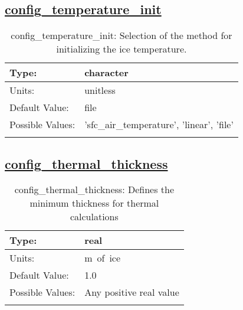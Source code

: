 \subsection[config\_temperature\_init]{\hyperref[sec:nm_tab_thermal_solver]{config\_temperature\_init}}
\label{subsec:nm_sec_config_temperature_init}
\begin{center}
\begin{longtable}{| p{2.0in} || p{4.0in} |}
    \hline
    Type: & character \\
    \hline
    Units: & \si{unitless} \\
    \hline
    Default Value: & file \\
    \hline
    Possible Values: & 'sfc\_air\_temperature', 'linear', 'file' \\
    \hline
    \caption{config\_temperature\_init: Selection of the method for initializing the ice temperature.}
\end{longtable}
\end{center}
\subsection[config\_thermal\_thickness]{\hyperref[sec:nm_tab_thermal_solver]{config\_thermal\_thickness}}
\label{subsec:nm_sec_config_thermal_thickness}
\begin{center}
\begin{longtable}{| p{2.0in} || p{4.0in} |}
    \hline
    Type: & real \\
    \hline
    Units: & \si{m.of.ice} \\
    \hline
    Default Value: & 1.0 \\
    \hline
    Possible Values: & Any positive real value \\
    \hline
    \caption{config\_thermal\_thickness: Defines the minimum thickness for thermal calculations}
\end{longtable}
\end{center}
